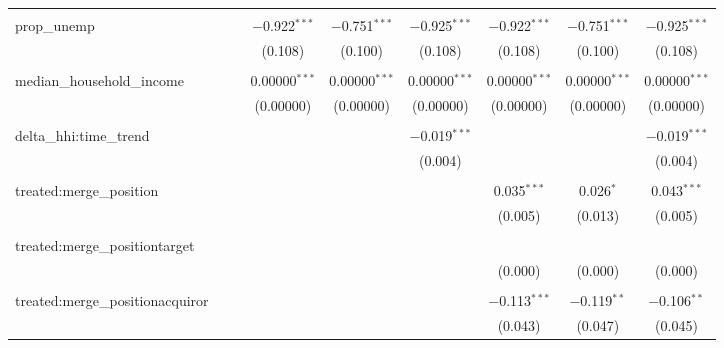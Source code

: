 \begin{table}[H]
{\begin{tabular}{@{\extracolsep{5pt}}lcccccccc}
   & & & & & & & & \\  

  prop\_unemp &  &  & $-$0.922$^{***}$ & $-$0.751$^{***}$ & $-$0.925$^{***}$ & $-$0.922$^{***}$ & $-$0.751$^{***}$ & $-$0.925$^{***}$ \\  

   &  &  & (0.108) & (0.100) & (0.108) & (0.108) & (0.100) & (0.108) \\  

   & & & & & & & & \\  

  median\_household\_income &  &  & 0.00000$^{***}$ & 0.00000$^{***}$ & 0.00000$^{***}$ & 0.00000$^{***}$ & 0.00000$^{***}$ & 0.00000$^{***}$ \\  

   &  &  & (0.00000) & (0.00000) & (0.00000) & (0.00000) & (0.00000) & (0.00000) \\  

   & & & & & & & & \\  

  delta\_hhi:time\_trend &  &  &  &  & $-$0.019$^{***}$ &  &  & $-$0.019$^{***}$ \\  

   &  &  &  &  & (0.004) &  &  & (0.004) \\  

   & & & & & & & & \\  

  treated:merge\_position &  &  &  &  &  & 0.035$^{***}$ & 0.026$^{*}$ & 0.043$^{***}$ \\  

   &  &  &  &  &  & (0.005) & (0.013) & (0.005) \\  

   & & & & & & & & \\  

  treated:merge\_positiontarget &  &  &  &  &  &  &  &  \\  

   &  &  &  &  &  & (0.000) & (0.000) & (0.000) \\  

   & & & & & & & & \\  

  treated:merge\_positionacquiror &  &  &  &  &  & $-$0.113$^{***}$ & $-$0.119$^{**}$ & $-$0.106$^{**}$ \\  

   &  &  &  &  &  & (0.043) & (0.047) & (0.045) \\  


\end{tabular}}
\end{table}
